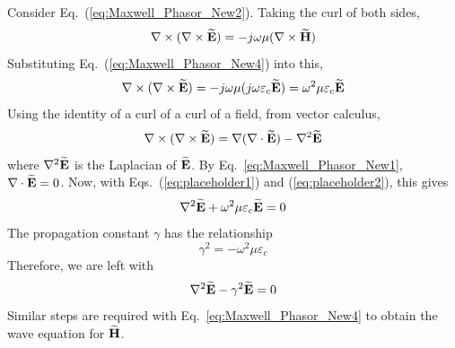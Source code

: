 \begin{proofBox} \label{proof:WaveEquations}
    Consider Eq.\ (\ref{eq:Maxwell_Phasor_New2}). Taking the curl of both sides, 
    \begin{equation}
        \nabla\times (\nabla\times \boldsymbol{\mathrm{\widetilde{E}}}) = -j\omega\mu(\nabla\times\boldsymbol{\mathrm{\widetilde{H}}})
    \end{equation}
    Substituting Eq.\ (\ref{eq:Maxwell_Phasor_New4}) into this, 
    \begin{equation}
        \nabla\times (\nabla\times\boldsymbol{\mathrm{\widetilde{E}}}) = -j\omega\mu(j\omega\varepsilon_c\boldsymbol{\mathrm{\widetilde{E}}}) = \omega^2\mu\varepsilon_c\boldsymbol{\mathrm{\widetilde{E}}} \label{eq:placeholder1}
    \end{equation}
    Using the identity of a curl of a curl of a field, from vector calculus, 
    \begin{equation}
        \nabla\times(\nabla\times\boldsymbol{\mathrm{\widetilde{E}}}) = \nabla(\nabla\cdot\boldsymbol{\mathrm{\widetilde{E}}}) - \nabla^2\boldsymbol{\mathrm{\widetilde{E}}} \label{eq:placeholder2}
    \end{equation}
    where $\nabla^2\boldsymbol{\mathrm{\widetilde{E}}}$ is the Laplacian of $\boldsymbol{\mathrm{\widetilde{E}}}$. By Eq.\ \ref{eq:Maxwell_Phasor_New1}, $\nabla\cdot\boldsymbol{\mathrm{\widetilde{E}}}=0$. Now, with Eqs.\ (\ref{eq:placeholder1}) and (\ref{eq:placeholder2}), this gives
    \begin{equation}
        \nabla^2\boldsymbol{\mathrm{\widetilde{E}}} + \omega^2\mu\varepsilon_c\boldsymbol{\mathrm{\widetilde{E}}} = 0
    \end{equation}
    The propagation constant $\gamma$ has the relationship 
    \begin{equation}
        \gamma^2 = -\omega^2\mu\varepsilon_c
    \end{equation}
    Therefore, we are left with 
    \begin{equation}
        \nabla^2\boldsymbol{\mathrm{\widetilde{E}}} - \gamma^2\boldsymbol{\mathrm{\widetilde{E}}} = 0
    \end{equation}
    Similar steps are required with Eq.\ \ref{eq:Maxwell_Phasor_New4} to obtain the wave equation for $\boldsymbol{\mathrm{\widetilde{H}}}$. 
\end{proofBox}

